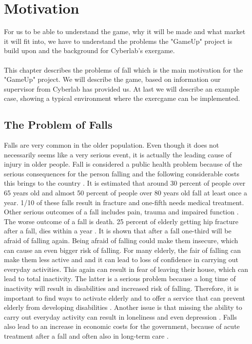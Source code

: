 \chapter{Motivation}
For us to be able to understand the game, why it will be made and what market it will fit into, we have to understand the problems the "GameUp" project is build upon and the background for Cyberlab's exergame.  \\ \\
This chapter describes the problems of fall which is the main motivation for the "GameUp" project. We will describe the game, based on information our supervisor from Cyberlab has provided us. At last we will describe an example case, showing a typical environment where the exercgame can be implemented.  
\section{The Problem of Falls}
Falls are very common in the older population. Even though it does not necessarily seems like a very serious event, it is actually the leading cause of injury in older people.  Fall is considered a public health problem because of the serious consequences for the person falling and the following considerable costs this brings to the country \cite{otago}.
It is estimated that around 30 percent of people over 65 years old and almost 50 percent of people over 80 years old fall at least once a year. 1/10 of these falls result in fracture and one-fifth needs medical treatment. Other serious outcomes of a fall includes pain, trauma and impaired function \cite{otago}.  The worse outcome of a fall is death. 25 percent of elderly getting hip fracture after a fall, dies within a year \cite{gruppetrening-trheim} \cite{larhalsbrudd}. It is shown that after a fall one-third will be afraid of falling again. Being afraid of falling could make them insecure, which can cause an even bigger risk of falling. For many elderly, the fair of falling can make them less active and and it can lead to loss of confidence in carrying out everyday activities. This again can result in fear of leaving their house, which can lead to total inactivity. The latter is a serious problem because a long time of inactivity will result in disabilities and increased risk of falling. Therefore, it is important to find ways to activate elderly and to offer a service that can prevent elderly from developing disabilities \cite{gruppetrening-trheim}. Another issue is that missing the ability to carry out everyday activity can result in loneliness and even depression \cite{exergamesforelderly}. Falls also lead to an increase in economic costs for the government, because of acute treatment after a fall and often also in long-term care \cite{otago}.\\ \\

